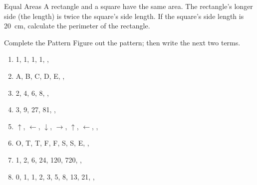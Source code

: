 \documentclass[14pt,letterpaper]{article}
\begin{document}
\begin{problem}{Equal Areas}
 A rectangle and a square have the same area. The rectangle's longer side (the
 length) is twice the square's side length. If the square's side length is
 \SI{20}{\centi\metre}, calculate the perimeter of the rectangle.
\end{problem}

\begin{problem}{Complete the Pattern}
 Figure out the pattern; then write the next two terms.

 \begin{enumerate}[\hspace{1cm}a.]
  \item 1, 1, 1, 1, , 
  \item A, B, C, D, E, , 
  \item 2, 4, 6, 8, , 
  \item 3, 9, 27, 81, , 
  \item $\uparrow$, $\leftarrow$, $\downarrow$, $\rightarrow$, $\uparrow$,
  $\leftarrow$, \Ans{\downarrow}, \Ans{\rightarrow}
  \item O, T, T, F, F, S, S, E, , 
  \item 1, 2, 6, 24, 120, 720, , 
  \item 0, 1, 1, 2, 3, 5, 8, 13, 21, , 
 \end{enumerate}
\end{problem}
\end{document}
